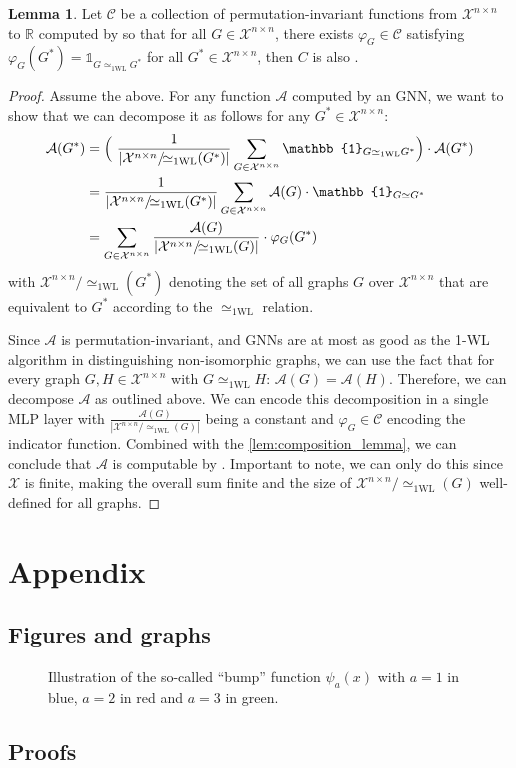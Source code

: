 \documentclass[11pt, dvipsnames, DIV=12]{scrreprt}
\theoremstyle{definition}
\newtheorem{lemma}[theorem]{Lemma}
\newcommand{\cA}{\mathcal{A}}
\newcommand{\cC}{\mathcal{C}}
\newcommand{\cX}{\mathcal{X}}
\newcommand{\Rb}{\mathbb{R}}
\newcommand{\wlnn}{\text{1-WL+NN}}
\newcommand{\wliso}{\simeq_{\text{1WL}}}
\newcommand{\xnn}{\mathcal{X}^{n \times n}}
\newcommand{\gapp}{\text{GNN-Approximating}}
\begin{document}
\begin{lemma}
    Let $\mathcal{C}$ be a collection of permutation-invariant functions from $\mathcal{X}^{n \times n}$ to $\Rb$  computed by \wlnn so that for all $G \in \mathcal{X}^{n \times n}$, there exists 
    $\varphi_G \in \cC$ satisfying $\varphi_G(G^*) = \mathbb{1}_{G \wliso G^*}$ for all $G^* \in \xnn$, then $C$ is also \gapp.
\end{lemma}

\begin{proof}
    Assume the above. For any function $\mathcal{A}$ computed by an GNN, we want to show that we can decompose it as follows for any $G^* \in \mathcal{X}^{n \times n}$:
    \begin{align}
        \mathcal{A}(G^*) &= \Bigl( \ \frac{1}{|\xnn/\!{\wliso}(G^*)|}\sum_{G \in \xnn} \mathbb{1}_{G \wliso G^*} \Bigr) \cdot \mathcal{A}(G^*) \nonumber \\
        &= \frac{1}{|\xnn/\!{\wliso}(G^*)|}\sum_{G \in \mathcal{X}^{n \times n}} \mathcal{A}(G) \cdot \mathbb{1}_{G \simeq G^*} \nonumber \\
        &= \sum_{G \in \mathcal{X}^{n \times n}} \frac{\mathcal{A}(G)}{|\xnn/\!{\wliso}(G)|}  \cdot \varphi_G(G^*)
    \end{align}
    with $\xnn/\!{\wliso}(G^*)$ denoting the set of all graphs $G$ over $\xnn$ that are equivalent to $G^*$ according to the $\wliso$ relation.

    Since $\cA$ is permutation-invariant, and GNNs are at most as good as the 1-WL algorithm in distinguishing non-isomorphic graphs, we can use the fact that for every graph $G,H \in \xnn$ with $G \wliso H$: $\cA(G) = \cA(H)$. Therefore, we can decompose $\cA$ as outlined above. We can encode this decomposition in a single MLP layer with $\frac{\cA(G)}{|\xnn/\!{\wliso}(G)|}$ being a constant and $\varphi_G \in \cC$ encoding the indicator function. Combined with the \cref{lem:composition_lemma}, we can conclude that $\cA$ is computable by \wlnn. Important to note, we can only do this since $\cX$ is finite, making the overall sum finite and the size of $\xnn/\!{\wliso}(G)$ well-defined for all graphs.
    
\end{proof}



\section*{Appendix}
\subsection*{Figures and graphs}
\begin{figure}[H]
    \centering
    
    \label{fig:bump_function}
    \caption{Illustration of the so-called ``bump'' function $\psi_a(x)$ with $a = 1$ in blue, $ a = 2$ in red and $a = 3$ in green.} 
\end{figure}

\subsection*{Proofs}




\end{document}
